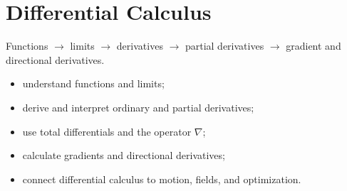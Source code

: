 \chapter{Differential Calculus}
\begin{roadmapbox}
Functions $\longrightarrow$ limits $\longrightarrow$ derivatives $\longrightarrow$ partial derivatives $\longrightarrow$ gradient and directional derivatives.
\end{roadmapbox}
\learningobjectives
\begin{itemize}
\item understand functions and limits;
\item derive and interpret ordinary and partial derivatives;
\item use total differentials and the operator $\nabla$;
\item calculate gradients and directional derivatives;
\item connect differential calculus to motion, fields, and optimization.
\end{itemize}
\newpage







